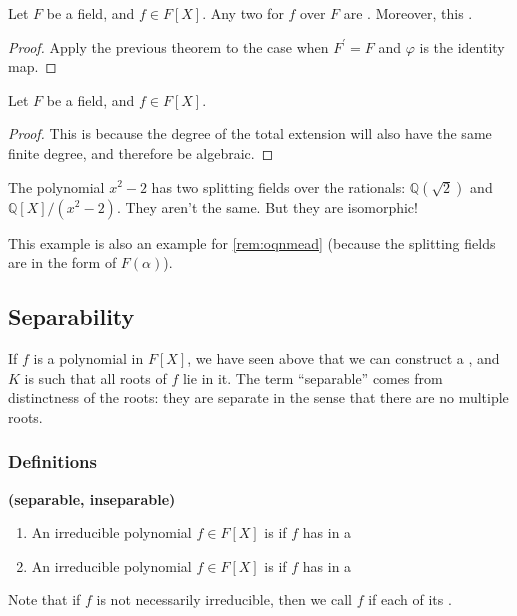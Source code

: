 \documentclass{article}
\newcommand{\bfs}[1]{\textbf{({#1}) }}
\begin{document}
\begin{cora}
    Let $F$ be a field, and $f \in F[X]$. Any two  for $f$ over $F$ are . Moreover, this .
\end{cora}
\begin{proof}
Apply the previous theorem to the case when $F^{\prime}=F$ and $\varphi$ is the identity map.
\end{proof}
\begin{cora}
    Let $F$ be a field, and $f \in F[X]$. 
\end{cora} 
\begin{proof}
This is because the degree of the total extension will also have the same finite degree, and therefore be algebraic.
\end{proof} 
\begin{exma}
The polynomial $x^{2}-2$ has two splitting fields over the rationals: $\mathbb{Q}(\sqrt{2})$ and $\mathbb{Q}[X] /\left(x^{2}-2\right)$. They aren't the same. But they are isomorphic!

This example is also an example for \cref{rem:oqnmead} (because the splitting fields are in the form of $F(\alpha)$).
\end{exma}

\subsection{Separability}\label{sec:ondarrw}
If $f$ is a polynomial in $F[X]$, we have seen above that we can construct a , and $K$ is such that all roots of $f$ lie in it. 
The term ``separable'' comes from distinctness of the roots: they are separate in the sense that there are no multiple roots.

\subsubsection{Definitions}
\begin{defa}\bfs{separable, inseparable}
\begin{enumerate}
    \item An irreducible polynomial $f \in F[X]$ is  if $f$ has  in a 
    \item  An irreducible polynomial $f \in F[X]$ is  if $f$ has  in a  
\end{enumerate}
 Note that if $f$ is not necessarily irreducible, then we call $f$  if each of its .
\end{defa}
\end{document}
